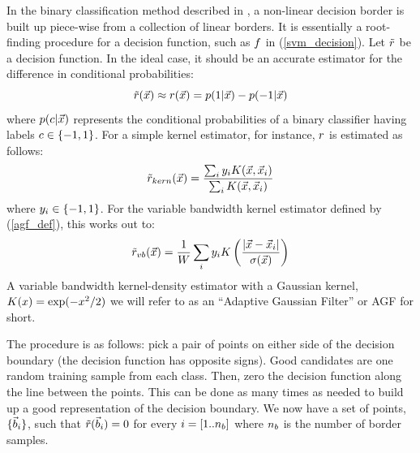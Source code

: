\documentclass[11pt]{article}
\begin{document}
In the binary classification method described in \citet{Mills2011},
a non-linear decision border is built up piece-wise from a collection of linear borders.
It is essentially a root-finding procedure for a decision function,
such as $f$ in (\ref{svm_decision}).
Let $\tilde r$ be a decision function. In the ideal case, it should
be an accurate estimator for the difference in conditional probabilities:
\begin{equation}
	\tilde r(\vec {x}) \approx r(\vec {x}) = 
	p(1|\vec {x}) - p(-1|\vec {x})
	\label{rdef}
\end{equation}
where $p(c|\vec {x})$ represents the conditional probabilities of
a binary classifier having labels $c \in \lbrace -1, 1 \rbrace$.
For a simple kernel estimator, for instance, 
$r$ is estimated as follows:
\begin{equation}
	\tilde r_{kern}(\vec {x}) = \frac{\sum_i y_i K(\vec {x}, \vec {x}_i)}{\sum_i K(\vec {x}, \vec {x}_i)}
	\label{kernel_decision}
\end{equation}
where $y_i \in \lbrace -1, 1 \rbrace$.
For the variable bandwidth kernel estimator defined by (\ref{agf_def}), this works out to:
\begin{equation}
	\tilde r_{vb}(\vec {x}) = \frac{1}{W} \sum_i y_i K \left (\frac{|\vec {x} - \vec {x}_i|}{\sigma(\vec {x})} \right )
	\label{vb_kernel_r}
\end{equation}
A variable bandwidth kernel-density estimator with a Gaussian kernel,
$K(x)=\exp(-x^2/2)$ we will refer to as an ``Adaptive Gaussian
Filter'' or AGF for short.

The procedure is as follows: pick a pair of points on either side of the decision
boundary (the decision function has opposite signs). Good candidates are one
random training sample from each class. Then, zero the decision function
along the line between the points. This can be done as many times as needed
to build up a good representation of the decision boundary.
We now have a set of points, $\lbrace \vec b_i \rbrace$, such that
$\tilde r(\vec b_i)=0$ for every $i=[1..n_b]$ where
$n_b$ is the number of border samples.
\end{document}
